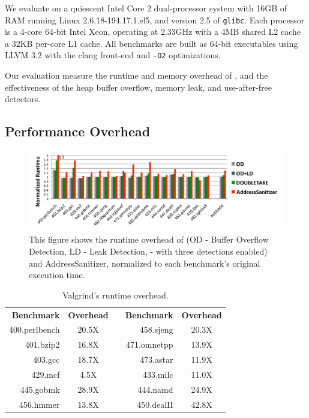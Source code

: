 \label{sec:evaluation}

We evaluate \doubletake{} on a quiescent Intel Core 2 dual-processor system with 16GB of RAM running Linux 2.6.18-194.17.1.el5, and version 2.5 of \texttt{glibc}. Each processor is a 4-core 64-bit Intel Xeon, operating at 2.33GHz with a 4MB shared L2 cache a 32KB per-core L1 cache. All benchmarks are built as 64-bit executables using LLVM 3.2 with the clang front-end and \texttt{-O2} optimizations.

Our evaluation measure the runtime and memory overhead of \doubletake{}, and the effectiveness of the heap buffer overflow, memory leak, and use-after-free detectors.

\subsection{Performance Overhead}
\label{sec:perf}

\begin{figure}[!ht]
	\begin{center}
		\includegraphics[width=6.5in]{doubletake/figure/perf}
	\end{center}
	\caption{This figure shows the runtime overhead of \doubletake{} (OD - Buffer Overflow Detection, LD - Leak Detection, \doubletake{} - with three detections enabled) and AddressSanitizer, normalized to each benchmark's original execution time. 
\label{fig:perf}}
\end{figure}

\begin{table}[t]
	\centering
	\begin{tabular}{r|c p{0.1em} r|c}
		\textbf{Benchmark} & \textbf{Overhead} & & \textbf{Benchmark} & \textbf{Overhead} \\
		\cline{1-2} \cline{4-5}
		400.perlbench	& 20.5X	& & 458.sjeng	& 20.3X	\\
		401.bzip2		& 16.8X	& & 471.omnetpp	& 13.9X	\\
		403.gcc			& 18.7X	& & 473.astar	& 11.9X	\\
		429.mcf			& 4.5X 	& & 433.milc		& 11.0X	\\
		445.gobmk		& 28.9X	& & 444.namd		& 24.9X	\\
		456.hmmer		& 13.8X	& & 450.dealII	& 42.8X	\\
	\end{tabular}
	\caption{Valgrind's runtime overhead. \label{table:valgrind}}
\end{table}


